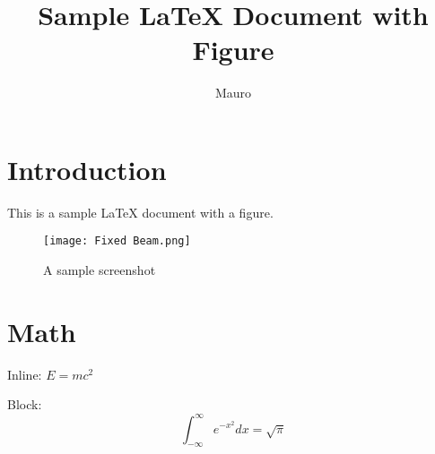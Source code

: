 \documentclass{article}
\title{Sample LaTeX Document with Figure}
\author{Mauro}
\begin{document}
\maketitle

\section{Introduction}

This is a sample LaTeX document with a figure.

\begin{figure}
\centering
\texttt{[image: Fixed Beam.png]}
\caption{A sample screenshot}
\label{fig:screenshot}
\end{figure}

\section{Math}

Inline: $E = mc^2$

Block:
\[
\int_{-\infty}^{\infty} e^{-x^2} dx = \sqrt{\pi}
\]
\end{document}
